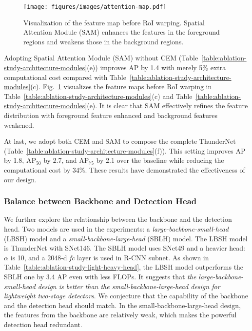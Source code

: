 \begin{figure}[!t]
\centering
\texttt{[image: figures/images/attention-map.pdf]}
\caption{Visualization of the feature map before RoI warping. Spatial Attention Module (SAM) enhances the features in the foreground regions and weakens those in the background regions.}
\label{figure:attention-feature-map}
\end{figure} 
Adopting Spatial Attention Module (SAM) without CEM (Table~\ref{table:ablation-study-architecture-modules}(e)) improves AP by 1.4 with merely 5\% extra computational cost compared with Table~\ref{table:ablation-study-architecture-modules}(c).
Fig.~\ref{figure:attention-feature-map} visualizes the feature maps before RoI warping in Table~\ref{table:ablation-study-architecture-modules}(c) and Table~\ref{table:ablation-study-architecture-modules}(e).
It is clear that SAM effectively refines the feature distribution with foreground feature enhanced and background features weakened.

At last, we adopt both CEM and SAM to compose the complete ThunderNet (Table~\ref{table:ablation-study-architecture-modules}(f)).
This setting improves AP by 1.8, AP$_{50}$ by 2.7, and AP$_{75}$ by 2.1 over the baseline while reducing the computational cost by 34\%.
These results have demonstrated the effectiveness of our design.

\vspace{-5pt}
\subsubsection{Balance between Backbone and Detection Head}
\label{section:large-backbone-or-heavy-head}

We further explore the relationship between the backbone and the detection head.
Two models are used in the experiments: a \emph{large-backbone-small-head} (LBSH) model and a \emph{small-backbone-large-head} (SBLH) model.
The LBSH model is ThunderNet with SNet146.
The SBLH model uses SNet49 and a heavier head: $\alpha$ is 10, and a 2048-d \emph{fc} layer is used in R-CNN subnet.
As shown in Table~\ref{table:ablation-study-light-heavy-head}, the LBSH model outperforms the SBLH one by 3.4 AP even with less FLOPs.
It suggests that \emph{the large-backbone-small-head design is better than the small-backbone-large-head design for lightweight two-stage detectors}.
We conjecture that the capability of the backbone and the detection head should match.
In the small-backbone-large-head design, the features from the backbone are relatively weak, which makes the powerful detection head redundant.

